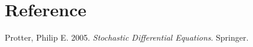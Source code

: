 \documentclass[
]{article}
\newlength{\cslhangindent}
\newlength{\cslentryspacingunit} %
\newenvironment{CSLReferences}[2] %
 {%
  \setlength{\parindent}{0pt}
  \ifodd #1
  \let\oldpar\par
  \def\par{\hangindent=\cslhangindent\oldpar}
  \fi
  \setlength{\parskip}{#2\cslentryspacingunit}
 }%
 {}
\theoremstyle{definition}
\theoremstyle{definition}
\theoremstyle{definition}
\theoremstyle{definition}
\theoremstyle{remark}
\begin{document}
\hypertarget{reference}{%
\section*{Reference}\label{reference}}

\hypertarget{refs}{}
\begin{CSLReferences}{1}{0}
\leavevmode{}%
Protter, Philip E. 2005. \emph{Stochastic Differential Equations}. Springer.

\end{CSLReferences}
\end{document}
